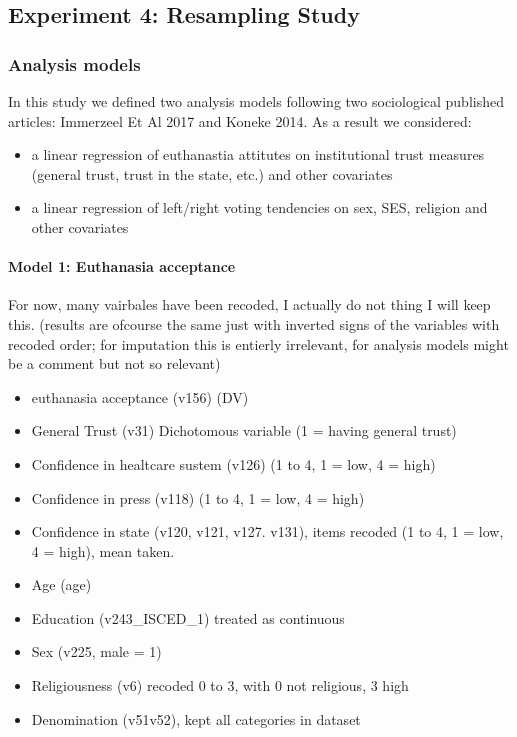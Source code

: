 \maketitle
\subsection{Experiment 4: Resampling Study}

\subsubsection{Analysis models}

In this study we defined two analysis models following two sociological published articles: 
Immerzeel Et Al 2017 and Koneke 2014. As a result we considered:
\begin{itemize}
	\item a linear regression of euthanastia attitutes on institutional trust measures (general trust, 
		trust in the state, etc.) and other covariates
	\item a linear regression of left/right voting tendencies on sex, SES, religion and other covariates
\end{itemize}

\paragraph{Model 1: Euthanasia acceptance}
For now, many vairbales have been recoded, I actually do not thing I will keep this.
(results are ofcourse the same just with inverted signs of the variables with recoded
order; for imputation this is entierly irrelevant, for analysis models might be
a comment but not so relevant)

\begin{itemize}
	\item euthanasia acceptance (v156) (DV)
	\item General Trust (v31) Dichotomous variable (1 = having general trust)
	\item Confidence in healtcare sustem (v126) (1 to 4, 1 = low, 4 = high)
	\item Confidence in press (v118) (1 to 4, 1 = low, 4 = high)
	\item Confidence in state (v120, v121, v127. v131), items recoded  (1 to 4, 
		1 = low, 4 = high), mean taken.
	\item Age (age)
	\item Education (v243\_ISCED\_1) treated as continuous
	\item Sex (v225, male = 1)
	\item Religiousness (v6) recoded 0 to 3, with 0 not religious, 3 high
	\item Denomination (v51v52), kept all categories in dataset
\end{itemize}

